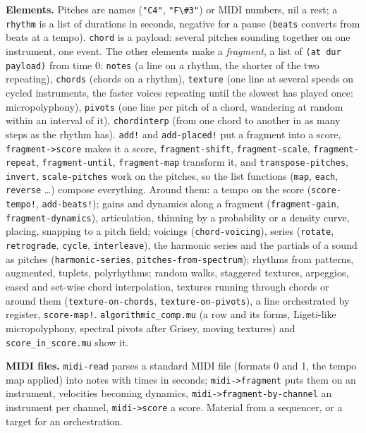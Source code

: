 \documentclass[11pt,a4paper]{article}
\newcommand{\musil}[1]{\lstinline[style=musilinline]{#1}}
\begin{document}
\textbf{Elements.} Pitches are names (\musil{"C4"}, \musil{"F\#3"}) or MIDI numbers, nil a
rest; a \musil{rhythm} is a list of durations in seconds, negative for a pause
(\musil{beats} converts from beats at a tempo). \musil{chord} is a payload: several pitches
sounding together on one instrument, one event. The other elements make a
\emph{fragment}, a list of \musil{(at dur payload)} from time 0: \musil{notes} (a line
on a rhythm, the shorter of the two repeating), \musil{chords} (chords on a rhythm),
\musil{texture} (one line at several speeds on cycled instruments, the faster voices
repeating until the slowest has played once: micropolyphony), \musil{pivots} (one line per
pitch of a chord, wandering at random within an interval of it), \musil{chordinterp} (from
one chord to another in as many steps as the rhythm has). \musil{add!} and
\musil{add-placed!} put a fragment into a score, \musil{fragment->score} makes it a score,
\musil{fragment-shift}, \musil{fragment-scale}, \musil{fragment-repeat},
\musil{fragment-until}, \musil{fragment-map} transform it, and \musil{transpose-pitches},
\musil{invert}, \musil{scale-pitches} work on the pitches, so the list functions
(\musil{map}, \musil{each}, \musil{reverse} \ldots) compose everything. Around them: a
tempo on the score (\musil{score-tempo!}, \musil{add-beats!}); gains and dynamics along a
fragment (\musil{fragment-gain}, \musil{fragment-dynamics}), articulation, thinning by a
probability or a density curve, placing, snapping to a pitch field; voicings
(\musil{chord-voicing}), series (\musil{rotate}, \musil{retrograde}, \musil{cycle},
\musil{interleave}), the harmonic series and the partials of a sound as pitches
(\musil{harmonic-series}, \musil{pitches-from-spectrum}); rhythms from patterns, augmented,
tuplets, polyrhythms; random walks, staggered textures, arpeggios, eased and set-wise chord
interpolation, textures running through chords or around them
(\musil{texture-on-chords}, \musil{texture-on-pivots}), a line orchestrated by register,
\musil{score-map!}. \texttt{algorithmic\_comp.mu} (a row and its forms, Ligeti-like
micropolyphony, spectral pivots after Grisey, moving textures) and
\texttt{score\_in\_score.mu} show it.

\textbf{MIDI files.} \musil{midi-read} parses a standard MIDI file (formats 0 and 1, the
tempo map applied) into notes with times in seconds; \musil{midi->fragment} puts them on
an instrument, velocities becoming dynamics, \musil{midi->fragment-by-channel} an
instrument per channel, \musil{midi->score} a score. Material from a sequencer, or a
target for an orchestration.
\end{document}
